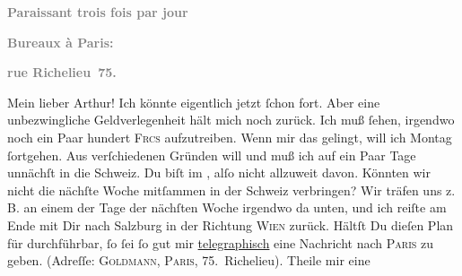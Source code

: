 \begin{ledgroupsized}[t]{13cm}
           \pstart
           \begin{otherlanguage}{french}\textcolor{gray}{\textbf{\textbf{Paraissant trois fois par jour}}}\end{otherlanguage}\pend
           \pstart
           \begin{otherlanguage}{french}\textcolor{gray}{\textbf{\textbf{Bureaux à Paris:}}}\end{otherlanguage}\pend
           \pstart
           \begin{otherlanguage}{french}\textcolor{gray}{\textbf{\textbf{rue Richelieu 75.}}}\end{otherlanguage}\pend
           \pstart
           Mein lieber Arthur!\pend
           \pstart
           Ich könnte eigentlich jetzt ſchon fort. Aber eine unbezwingliche Geldverlegenheit
               hält mich noch zurück. Ich muß ſehen, irgendwo noch ein Paar hundert \textsc{Frcs} aufzutreiben. Wenn mir das gelingt, will ich Montag ſortgehen. Aus verſchiedenen Gründen will und muß
               ich auf ein Paar Tage unnächſt in die Schweiz.
               Du biſt im \label{K_L02713-1v}\label{K_L02713-1h}, alſo nicht allzuweit davon. Könnten wir nicht
               die nächſte Woche mitſammen {\pb}in der Schweiz verbringen? Wir träfen uns z. B. an einem der Tage
               der nächſten Woche irgendwo da unten, und ich reiſte am Ende mit Dir nach Salzburg in der Richtung \textsc{Wien} zurück. Hältſt Du dieſen Plan für durchführbar, ſo ſei ſo gut mir \uline{telegraphisch} eine Nachricht nach \textsc{Paris} zu geben. (Adreſſe: \textsc{Goldmann}, \textsc{Paris}, 75. Richelieu). Theile mir eine

\end{ledgroupsized}
